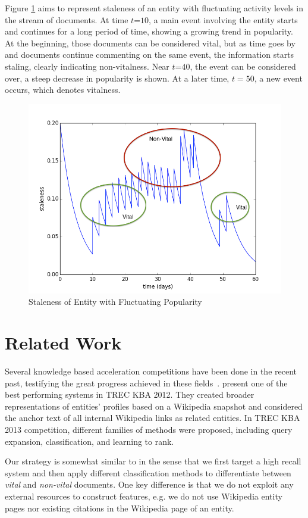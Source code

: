 \documentclass{sig-alternate}
\begin{document}
Figure \ref{stalenessmedium} aims to represent staleness of an entity with fluctuating activity levels in the stream of documents. At time $t\mathord{=}10$, a main event involving the entity starts and continues for a long period of time, showing a growing trend in popularity. 
At the beginning, those documents can be considered vital, but as time goes by and documents continue commenting on the same event, the information starts staling, clearly indicating non-vitalness.
Near $t\mathord{=}40$, the event can be considered over, a steep decrease in popularity is shown. At a later time, $t=50$, a new event occurs, which denotes vitalness.

\begin{figure}[tb]
\centering
\includegraphics[width=0.7\columnwidth]{fig/staleness2.png}
\caption{Staleness of Entity with Fluctuating Popularity}
\label{stalenessmedium}
\end{figure}

\section{Related Work}
\label{related}

Several knowledge based acceleration competitions have been done in the recent past, testifying the great progress achieved in these fields~\cite{gross_doucet_toivonen_trec12}. 
\citet{xitong12} present one of the best performing systems in TREC KBA 2012. 
They created broader representations of entities' profiles based on a Wikipedia snapshot and considered the anchor text of all internal Wikipedia links as related entities. In TREC KBA 2013 competition, different families of methods were proposed, including query expansion, classification, and learning to rank. 

Our strategy is somewhat similar to \citet{jingang13} in the sense that we first target a high recall system and then apply different classification methods to differentiate between \emph{vital} and \emph{non-vital} documents. 
One key difference is that we do not exploit any external resources to construct features, e.g. we do not use Wikipedia entity pages nor existing citations in the Wikipedia page of an entity. 
\end{document}
